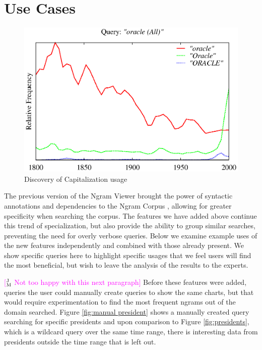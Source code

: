 \documentclass[11pt,a4paper]{article}
\newcommand{\jmcomment}[1]{\textcolor{magenta}{[$^{\textsc{J}}_{\textsc{M}}$ #1]}}
\begin{document}
\section{Use Cases}
\label{sec:usecases}
\begin{figure}
\centering
\includegraphics[width=.9\textwidth]{graphs/oracle}
\caption{\label{fig:apple} Discovery of Capitalization usage}
\end{figure}
The previous version of the Ngram Viewer brought the power of syntactic annotations and dependencies to the Ngram Corpus \cite{lin2012syntactic}, allowing for greater specificity when searching the corpus. The features we have added above continue this trend of specialization, but also provide the ability to group similar searches, preventing the need for overly verbose queries. Below we examine example uses of the new features independently and combined with those already present. We show specific queries here to highlight specific usages that we feel users will find the most beneficial, but wish to leave the analysis of the results to the experts.


\jmcomment{Not too happy with this next paragraph}
Before these features were added, queries the user could manually create queries to show the same charts, but that would require experimentation to find the most frequent ngrams out of the domain searched. Figure \ref{fig:manual president} shows a manually created query searching for specific presidents and upon comparison to Figure \ref{fig:presidents}, which is a wildcard query over the same time range, there is interesting data from presidents outside the time range that is left out.
\end{document}
